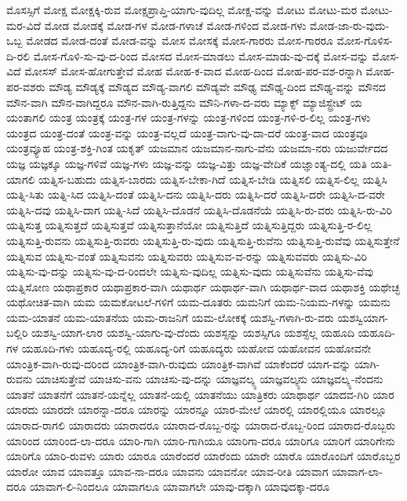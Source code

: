 {ಮೊಸಸ್ಸಿಗೆ
ಮೋಕ್ಷ
ಮೋಕ್ಷಕ್ಕಿ-ರುವ
ಮೋಕ್ಷಪ್ರಾಪ್ತಿ-ಯಾಗು-ವುದಿಲ್ಲ
ಮೋಕ್ಷ-ವನ್ನು
ಮೋಟು
ಮೋಟು-ಮರ
ಮೋಟು-ಮರ-ವಿದೆ
ಮೋಡ
ಮೋಡಕ್ಕೆ
ಮೋಡ-ಗಳ
ಮೋಡ-ಗಳಾಚೆ
ಮೋಡ-ಗಳಿಂದ
ಮೋಡ-ಗಳು
ಮೋಡ-ಜಾ-ರು-ವುದು-ಒಬ್ಬ
ಮೋಡದ
ಮೋಡ-ದಂತೆ
ಮೋಡ-ವನ್ನು
ಮೋಸ
ಮೋಸಕ್ಕೆ
ಮೋಸ-ಗಾರರು
ಮೋಸ-ಗಾರರೂ
ಮೋಸ-ಗೊಳಿಸ-ದಿ-ರಲಿ
ಮೋಸ-ಗೊಳಿ-ಸು-ವು-ದ-ರಿಂದ
ಮೋಸದ
ಮೋಸ-ಮಾಡಲು
ಮೋಸ-ಮಾಡು-ವು-ದಕ್ಕೆ
ಮೋಸ-ವನ್ನು
ಮೋಸ-ವಿದೆ
ಮೋಸಸ್
ಮೋಸ-ಹೋಗುತ್ತೇವೆ
ಮೋಹ
ಮೋಹ-ಕ-ವಾದ
ಮೋಹ-ದಿಂದ
ಮೋಹ-ಪರ-ವಶ-ರನ್ನಾಗಿ
ಮೋಹ-ಪರ-ವಶರು
ಮೌಡ್ಯ
ಮೌಡ್ಯಕ್ಕೆ
ಮೌಡ್ಯದ
ಮೌಡ್ಯ-ವಾಗಲಿ
ಮೌಡ್ಯವೇ
ಮೌಢ್ಯ
ಮೌಢ್ಯ-ದಿಂದ
ಮೌಢ್ಯ-ವನ್ನು
ಮೌನದ
ಮೌನ-ವಾಗಿ
ಮೌನ-ವಾಗಿದ್ದರೂ
ಮೌನ-ವಾಗಿ-ರುತ್ತಿದ್ದನು
ಮೌನಿ-ಗಳಾ-ದ-ವರು
ಮ್ಯಾಕ್ಸ್
ಮ್ಯಾಜಿಸ್ಟ್ರೇಟ್
ಯ
ಯಂತಾಗಲಿ
ಯಂತ್ರ
ಯಂತ್ರಕ್ಕೆ
ಯಂತ್ರ-ಗಳ
ಯಂತ್ರ-ಗಳನ್ನು
ಯಂತ್ರ-ಗಳಿಂದ
ಯಂತ್ರ-ಗಳಿ-ರ-ಲಿಲ್ಲ
ಯಂತ್ರ-ಗಳು
ಯಂತ್ರದ
ಯಂತ್ರ-ದಂತೆ
ಯಂತ್ರ-ವನ್ನು
ಯಂತ್ರ-ವಲ್ಲದೆ
ಯಂತ್ರ-ವಾಗು-ವು-ದಾ-ದರೆ
ಯಂತ್ರ-ವಾದ
ಯಂತ್ರವೂ
ಯಂತ್ರವ್ಯೂಹ
ಯಂತ್ರ-ಶಕ್ತಿ-ಗಿಂತ
ಯಕೃತ್
ಯಜಮಾನ
ಯಜಮಾನ-ನಾಗು-ವೆನು
ಯಜಮಾ-ನರು
ಯಜುರ್ವೇದದ
ಯಜ್ಞ
ಯಜ್ಞಕ್ಕೂ
ಯಜ್ಞ-ಗಳಿವೆ
ಯಜ್ಞ-ಗಳು
ಯಜ್ಞ-ವನ್ನು
ಯಜ್ಞ-ವಿತ್ತು
ಯಜ್ಞ-ವೇದಿಕೆ
ಯಜ್ಞಾಂತ್ಯ-ದಲ್ಲಿ
ಯತಿ
ಯತಿ-ಯಾಗಲಿ
ಯತ್ನಿಸ-ಬಹುದು
ಯತ್ನಿಸ-ಬಾರದು
ಯತ್ನಿಸ-ಬೇಕಾ-ಗಿದೆ
ಯತ್ನಿಸ-ಬೇಡಿ
ಯತ್ನಿಸಲಿ
ಯತ್ನಿಸ-ಲಿಲ್ಲ
ಯತ್ನಿಸಿ
ಯತ್ನಿ-ಸಿತು
ಯತ್ನಿ-ಸಿದ
ಯತ್ನಿಸಿ-ದಂತೆ
ಯತ್ನಿಸಿ-ದನು
ಯತ್ನಿಸಿ-ದರು
ಯತ್ನಿಸಿ-ದರೆ
ಯತ್ನಿಸಿ-ದರೇ
ಯತ್ನಿಸಿ-ದ-ವರೇ
ಯತ್ನಿಸಿ-ದವು
ಯತ್ನಿಸಿ-ದಾಗ
ಯತ್ನಿ-ಸಿದೆ
ಯತ್ನಿಸಿ-ದೊಡನೆ
ಯತ್ನಿಸಿ-ದೊಡನೆಯೆ
ಯತ್ನಿಸಿ-ರು-ವರು
ಯತ್ನಿಸಿ-ರು-ವಿರಿ
ಯತ್ನಿಸುತ್ತ
ಯತ್ನಿಸುತ್ತದೆ
ಯತ್ನಿಸುತ್ತವೆ
ಯತ್ನಿಸುತ್ತಾನೆಯೋ
ಯತ್ನಿಸುತ್ತಿದೆ
ಯತ್ನಿಸುತ್ತಿದ್ದರು
ಯತ್ನಿಸುತ್ತಿ-ರ-ಲಿಲ್ಲ
ಯತ್ನಿಸುತ್ತಿ-ರುವನು
ಯತ್ನಿಸುತ್ತಿ-ರುವರು
ಯತ್ನಿಸುತ್ತಿ-ರು-ವುದು
ಯತ್ನಿಸುತ್ತಿ-ರುವೆನು
ಯತ್ನಿಸುತ್ತಿ-ರುವೆವು
ಯತ್ನಿಸುತ್ತೇನೆ
ಯತ್ನಿಸುವ
ಯತ್ನಿಸು-ವಂತೆ
ಯತ್ನಿಸುವನು
ಯತ್ನಿಸುವರು
ಯತ್ನಿಸುವ-ವ-ರನ್ನು
ಯತ್ನಿಸುವವರು
ಯತ್ನಿಸು-ವಿರಿ
ಯತ್ನಿಸು-ವು-ದನ್ನು
ಯತ್ನಿಸು-ವು-ದ-ರಿಂದಲೇ
ಯತ್ನಿಸು-ವುದಿಲ್ಲ
ಯತ್ನಿಸು-ವುದು
ಯತ್ನಿಸುವೆನು
ಯತ್ನಿಸು-ವೆವು
ಯತ್ನಿಸೋಣ
ಯಥಾಪ್ರಕಾರ
ಯಥಾಪ್ರಕಾರ-ವಾಗಿ
ಯಥಾರ್ಥ
ಯಥಾರ್ಥ-ವಾಗಿ
ಯಥಾರ್ಥ-ವಾದ
ಯಥಾಶಕ್ತಿ
ಯಥೇಚ್ಛ
ಯಥೋಚಿತ-ವಾಗಿ
ಯಮ
ಯಮಕೋಟಲೆ-ಗಳಿಗೆ
ಯಮ-ದೂತರು
ಯಮನಿಗೆ
ಯಮ-ನಿಯಮ-ಗಳನ್ನು
ಯಮನು
ಯಮ-ಯಾತನೆ
ಯಮ-ಯಾತನೆಯ
ಯಮ-ರಾಜನಿಗೆ
ಯಮ-ಲೋಕಕ್ಕೆ
ಯಶಸ್ವಿ-ಗಳಾಗಿ-ರು-ವರು
ಯಶಸ್ವಿಯಾಗ-ಬಲ್ಲಿರಿ
ಯಶಸ್ವಿ-ಯಾಗ-ಲಾರ
ಯಶಸ್ವಿ-ಯಾಗು-ವು-ದೆಂದು
ಯಶಸ್ಸನ್ನು
ಯಶಸ್ಸಿಗೂ
ಯಶಸ್ಸೆಲ್ಲ
ಯಹೂದಿ
ಯಹೂದಿ-ಗಳ
ಯಹೂದಿ-ಗಳು
ಯಹೂದ್ಯ-ರಲ್ಲಿ
ಯಹೂದ್ಯ-ರಿಗೆ
ಯಹೂದ್ಯರು
ಯಹೋವ
ಯಹೋವನ
ಯಹೋವನೇ
ಯಾಂತ್ರಿಕ-ವಾಗಿ-ರುವು-ದರಿಂದ
ಯಾಂತ್ರಿಕ-ವಾಗಿ-ರುವುದು
ಯಾಂತ್ರಿಕ-ವಾಗಿವೆ
ಯಾಕೆಂದರೆ
ಯಾಗ-ವನ್ನು
ಯಾಗಿ-ರುವನು
ಯಾಚಿಸುತ್ತೇವೆ
ಯಾಚಿಸು-ವನು
ಯಾಚಿಸು-ವು-ದನ್ನು
ಯಾಜ್ಞವಲ್ಕ್ಯ
ಯಾಜ್ಞವಲ್ಕ್ಯನು
ಯಾಜ್ಞವಲ್ಕ್ಯ-ನೆಂದನು
ಯಾತನೆ
ಯಾತನೆಗೆ
ಯಾತನೆ-ಯನ್ನೆಲ್ಲ
ಯಾತನೆ-ಯಲ್ಲಿ
ಯಾತನೆಯು
ಯಾತ್ರಿಕರು
ಯಾಥಾರ್ಥ
ಯಾದವ-ಗಿರಿ
ಯಾರ
ಯಾರದು
ಯಾರದೇ
ಯಾರನ್ನಾ-ದರೂ
ಯಾರನ್ನು
ಯಾರನ್ನೂ
ಯಾರ-ಮೇಲೆ
ಯಾರಲ್ಲಿ
ಯಾರಲ್ಲಿಯೂ
ಯಾರಲ್ಲೂ
ಯಾರಾದ-ರಾಗಲಿ
ಯಾರಾದರು
ಯಾರಾದರೂ
ಯಾರಾದ-ರೊಬ್ಬ-ರನ್ನು
ಯಾರಾದ-ರೊಬ್ಬ-ರಿಂದ
ಯಾರಾದ-ರೊಬ್ಬರು
ಯಾರಿಂದ
ಯಾರಿಂದ-ಲಾ-ದರೂ
ಯಾರಿ-ಗಾಗಿ
ಯಾರಿ-ಗಾಗಿಯೂ
ಯಾರಿಗಾ-ದರೂ
ಯಾರಿಗೂ
ಯಾರಿಗೆ
ಯಾರಿಗೇನು
ಯಾರಿಗೊ
ಯಾರಿ-ರುವಳು
ಯಾರು
ಯಾರೂ
ಯಾರೆಂದರೆ
ಯಾರೆಂದು
ಯಾರೇ
ಯಾರೊ
ಯಾರೊಂದಿಗೆ
ಯಾರೊಬ್ಬರ
ಯಾರೋ
ಯಾವ
ಯಾವತ್ತೂ
ಯಾವ-ನಾ-ದರೂ
ಯಾವನು
ಯಾವನೋ
ಯಾವ-ರೀತಿ
ಯಾವಾಗ
ಯಾವಾಗ-ಲಾ-ದರೂ
ಯಾವಾಗ-ಲಿ-ನಿಂದಲೂ
ಯಾವಾಗಲೂ
ಯಾವಾಗಲೇ
ಯಾವು-ದಕ್ಕಾಗಿ
ಯಾವುದಕ್ಕಾ-ದರೂ
}

